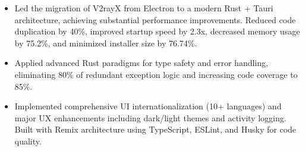 \documentclass{resume}
\newcommand{\en}[1]{#1}
\newcommand{\zh}[1]{}
\begin{document}
\en{}
\zh{\datedsubsection{\textbf{\href{https://github.com/shaonhuang/V2rayX}{跨平台代理客户端 – V2rayX（Rust/Tauri 2 重构版本）}}}{}}
\begin{itemize}
    \item \en{Led the migration of V2rayX from Electron to a modern Rust + Tauri architecture, achieving substantial performance improvements. Reduced code duplication by 40\%, improved startup speed by 2.3x, decreased memory usage by 75.2\%, and minimized installer size by 76.74\%.}
          \zh{\href{\detokenize{https://shaonhuang.vercel.app/posts/v2rayx-refactor}}{将 Electron 版本迁移至 Tauri + Rust 架构}，显著提升应用性能和稳定性，减少资源占用。代码重复率减少40\%。应用启动速度提升 2.3倍，内存占用减少 75.2\%(161.4M -> 40M)。安装包体积下降约76.74\%。}
    \item \en{Applied advanced Rust paradigms for type safety and error handling, eliminating 80\% of redundant exception logic and increasing code coverage to 85\%.}
          \zh{利用 Rust 的类型安全和错误处理机制设计思想，减少重复的异常处理代码，提高代码质量和可维护性。删除 80\% 重复异常检测代码，代码覆盖率提高至 85\%。}
    \item \en{Implemented comprehensive UI internationalization (10+ languages) and major UX enhancements including dark/light themes and activity logging. Built with Remix architecture using TypeScript, ESLint, and Husky for code quality.}
          \zh{增加 UI 国际化与 UX 设计，支持十种以上语言（中、英、波斯等）和暗黑/浅色主题；实现活动日志、服务分享等实用增强功能，基于 Remix 全栈架构，采用 TypeScript、ESLint、Husky 保证代码质量，后端逻辑使用 Rust 实现安全性能兼顾。}
\end{itemize}
\end{document}
